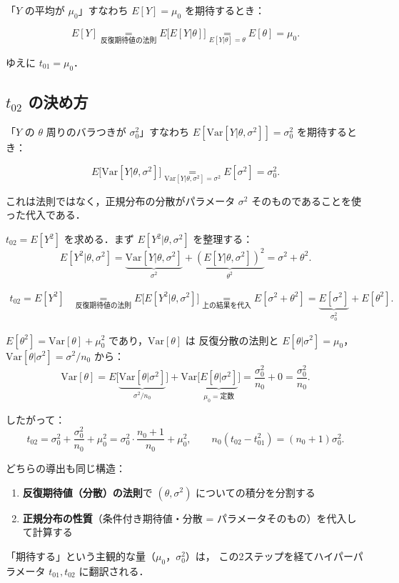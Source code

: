 \documentclass[lualatex,ja=standard,a4paper,12pt]{bxjsarticle}
\begin{document}
「$Y$ の平均が $\mu_0$」すなわち $E[Y] = \mu_0$ を期待するとき：

\[
  E[Y]
  \underset{\text{反復期待値の法則}}{=} E\!\bigl[E[Y|\theta]\bigr]
  \underset{E[Y|\theta]=\theta}{=} E[\theta]
  = \mu_0.
\]

ゆえに $t_{01} = \mu_0$．

\subsection*{$t_{02}$ の決め方}

「$Y$ の $\theta$ 周りのバラつきが $\sigma_0^2$」すなわち
$E[\mathrm{Var}[Y|\theta,\sigma^2]] = \sigma_0^2$ を期待するとき：

\[
  E\!\bigl[\mathrm{Var}[Y|\theta,\sigma^2]\bigr]
  \underset{\mathrm{Var}[Y|\theta,\sigma^2]=\sigma^2}{=} E[\sigma^2] = \sigma_0^2.
\]

これは法則ではなく，正規分布の分散がパラメータ $\sigma^2$ そのものであることを使った代入である．

\medskip
$t_{02} = E[Y^2]$ を求める．まず $E[Y^2|\theta,\sigma^2]$ を整理する：
\[
  E[Y^2|\theta,\sigma^2]
  = \underbrace{\mathrm{Var}[Y|\theta,\sigma^2]}_{\sigma^2}
  + \underbrace{(E[Y|\theta,\sigma^2])^2}_{\theta^2}
  = \sigma^2 + \theta^2.
\]

\begin{derivbox}
\begin{align*}
  t_{02} = E[Y^2]
  &\underset{\text{反復期待値の法則}}{=} E\!\bigl[E[Y^2|\theta,\sigma^2]\bigr]
   \underset{\text{上の結果を代入}}{=} E[\sigma^2 + \theta^2]
   = \underbrace{E[\sigma^2]}_{\sigma_0^2} + E[\theta^2].
\end{align*}

$E[\theta^2] = \mathrm{Var}[\theta] + \mu_0^2$ であり，$\mathrm{Var}[\theta]$ は
反復分散の法則と $E[\theta|\sigma^2]=\mu_0$，$\mathrm{Var}[\theta|\sigma^2]=\sigma^2/n_0$ から：
\[
  \mathrm{Var}[\theta]
  = E\!\bigl[\underbrace{\mathrm{Var}[\theta|\sigma^2]}_{\sigma^2/n_0}\bigr]
  + \mathrm{Var}\!\bigl[\underbrace{E[\theta|\sigma^2]}_{\mu_0=\text{定数}}\bigr]
  = \frac{\sigma_0^2}{n_0} + 0
  = \frac{\sigma_0^2}{n_0}.
\]

したがって：
\[
  t_{02} = \sigma_0^2 + \frac{\sigma_0^2}{n_0} + \mu_0^2
         = \sigma_0^2\cdot\frac{n_0+1}{n_0} + \mu_0^2,
  \qquad
  n_0(t_{02} - t_{01}^2) = (n_0+1)\sigma_0^2.
\]
\end{derivbox}

\begin{pointbox}
どちらの導出も同じ構造：
\begin{enumerate}
  \item \textbf{反復期待値（分散）の法則}で $(\theta,\sigma^2)$ についての積分を分割する
  \item \textbf{正規分布の性質}（条件付き期待値・分散 = パラメータそのもの）を代入して計算する
\end{enumerate}
「期待する」という主観的な量（$\mu_0$，$\sigma_0^2$）は，
この2ステップを経てハイパーパラメータ $t_{01}, t_{02}$ に翻訳される．
\end{pointbox}
\end{document}
